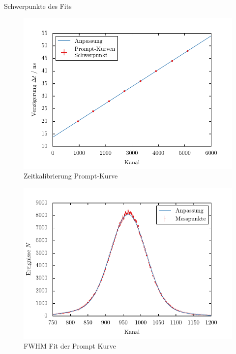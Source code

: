 \documentclass[11pt, a4paper]{article}
\numberwithin{equation}{section}
\begin{document}
\begin{table}[h]
	\centering
	
	\caption{Schwerpunkte des Fits}
\end{table}

\begin{figure}[h]
	\centering
	\includegraphics{./figures/prompt_curve.pdf}
	\caption{Zeitkalibrierung Prompt-Kurve}
\end{figure}


\begin{figure}[h]
	\centering
	\includegraphics{./figures/fwhm_fit.pdf}
	\caption{FWHM Fit der Prompt Kurve}
	\label{fig:promptkurve_einzeln}
\end{figure}
\end{document}
